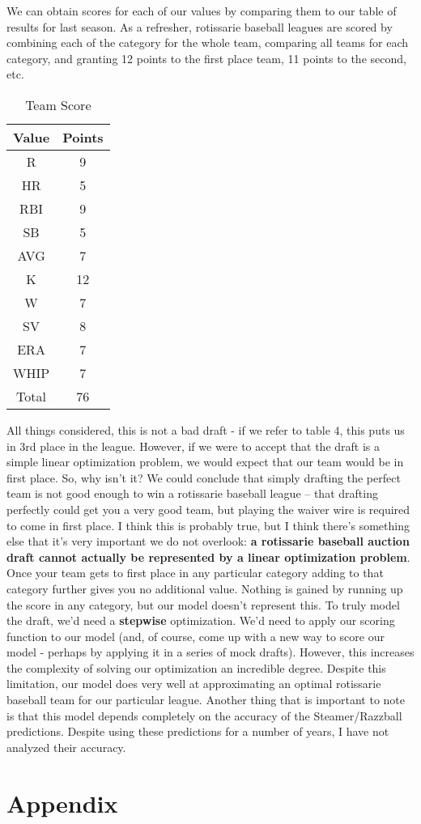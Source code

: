 \documentclass{article}
\begin{document}
We can obtain scores for each of our values by comparing them to our table of results for last season. As a refresher, rotissarie baseball leagues are scored by combining each of the category for the whole team, comparing all teams for each category, and granting 12 points to the first place team, 11 points to the second, etc. 

\begin{table}[ht] \caption{Team Score}
\centering 
\begin{tabular}{c c}
\hline\hline
Value & Points \\
\hline
R & 9 \\
HR & 5 \\
RBI & 9 \\
SB & 5 \\
AVG & 7 \\
K & 12 \\
W & 7 \\
SV & 8 \\
ERA & 7 \\
WHIP & 7 \\
\hline
Total & 76 \\
[1ex] 
\hline
\end{tabular}
\end{table}
\newpage
All things considered, this is not a bad draft - if we refer to table 4, this puts us in 3rd place in the league. However, if we were to accept that the draft is a simple linear optimization problem, we would expect that our team would be in first place. So, why isn't it? We could conclude that simply drafting the perfect team is not good enough to win a rotissarie baseball league -- that drafting perfectly could get you a very good team, but playing the waiver wire is required to come in first place. I think this is probably true, but I think there's something else that it's very important we do not overlook: \textbf{a rotissarie baseball auction draft cannot actually be represented by a linear optimization problem}. Once your team gets to first place in any particular category adding to that category further gives you no additional value. Nothing is gained by running up the score in any category, but our model doesn't represent this. To truly model the draft, we'd need a \textbf{stepwise} optimization. We'd need to apply our scoring function to our model (and, of course, come up with a new way to score our model - perhaps by applying it in a series of mock drafts). However, this increases the complexity of solving our optimization an incredible degree. Despite this limitation, our model does very well at approximating an optimal rotissarie baseball team for our particular league. Another thing that is important to note is that this model depends completely on the accuracy of the Steamer/Razzball predictions. Despite using these predictions for a number of years, I have not analyzed their accuracy.
\newpage
\appendix
\section*{Appendix}
\end{document}
